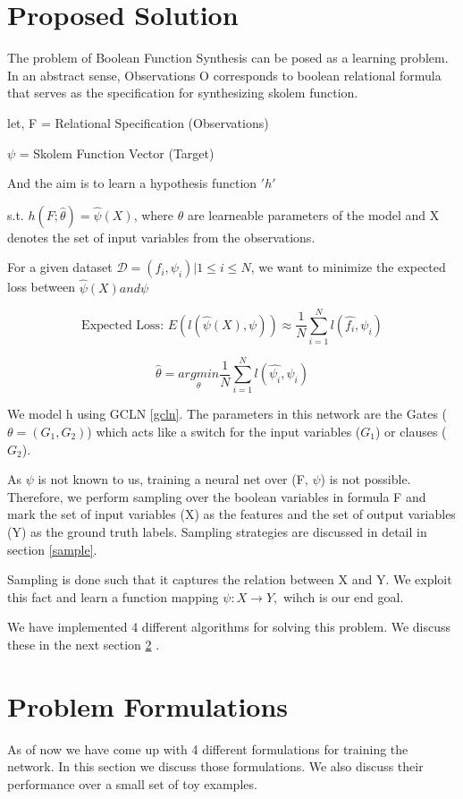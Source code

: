 \section{Proposed Solution}
The problem of Boolean Function Synthesis can be posed as a learning problem. 
In an abstract sense, Observations O corresponds to boolean relational formula 
that serves as the specification for synthesizing skolem function.

let, F = Relational Specification (Observations)

$\psi$ = Skolem Function Vector (Target)

And the aim is to learn a hypothesis function $'h'$ 

s.t.  $h(F;\hat{\theta}) = \hat{\psi}(X)$, where $\theta$ are learneable parameters of the model and
X denotes the set of input variables from the observations.

For a given dataset $\mathcal{D} = {(f_i, \psi_i)|1 \leq i \leq N}$, we want to minimize the 
expected loss between $\hat{\psi}(X) and \psi$

$$\text{Expected Loss: } E(l(\hat{\psi}(X), \psi)) \approx \frac{1}{N} \sum_{i=1}^{N} l(\hat{f_i}, \psi_i) $$

$$\hat{\theta} = \underset{\theta}{argmin} \frac{1}{N} \sum_{i=1}^{N} l(\hat{\psi_i}, \psi_i)$$

We model h using GCLN \ref{gcln}. 
The parameters in this network are the Gates ($\theta = (G_1, G_2)$) which acts like a switch 
for the input variables ($G_{1}$) or clauses ($G_{2}$).

As $\psi$ is not known to us, training a neural net over (F, $\psi$) is not possible. Therefore,
we perform sampling over
the boolean variables in formula F and mark the set of input variables (X) as the features and 
the set of output variables 
(Y) as the ground truth labels. Sampling strategies are discussed in detail in section \ref{sample}.

Sampling is done such that it captures the relation between X and Y. We exploit this fact and learn 
a function mapping $\psi: X \rightarrow Y,$ wihch is our end goal.

We have implemented 4 different algorithms for solving this problem. We discuss these in the next section
\ref{algo} .




\section{Problem Formulations}\label{algo}
As of now we have come up with 4 different formulations for training the network. 
In this section we discuss those formulations. 
We also discuss their performance over a small set of toy examples.

